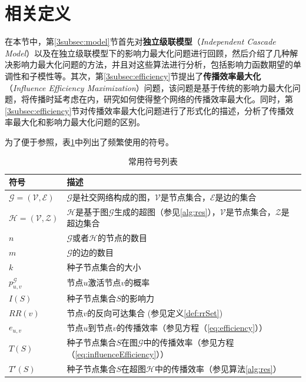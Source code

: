 \section{相关定义}
\label{3sec:definition}
在本节中，第\ref{3subsec:model}节首先对\textbf{独立级联模型}（\textit{Independent Cascade Model}）以及在独立级联模型下的影响力最大化问题进行回顾，然后介绍了几种解决影响力最大化问题的方法，并且对这些算法进行分析，包括影响力函数期望的单调性和子模性等。其次，第\ref{3subsec:efficiency}节提出了\textbf{传播效率最大化}（\textit{Influence Efficiency Maximization}）问题，该问题是基于传统的影响力最大化问题，将传播时延考虑在内，研究如何使得整个网络的传播效率最大化。同时，第\ref{3subsec:efficiency}节对传播效率最大化问题进行了形式化的描述，分析了传播效率最大化和影响力最大化问题的区别。

为了便于参照，表\ref{3tab:notation}中列出了频繁使用的符号。

\begin{table}[ht]
\centering
\caption{常用符号列表}
\begin{tabular}{|p{2cm}|p{10cm}|}
\hline
\textbf{符号} & \textbf{描述} \\
\hline
$\mathcal{G}=\left(\mathcal{V},\mathcal{E}\right)$ & $\mathcal{G}$是社交网络构成的图，$\mathcal{V}$是节点集合，$\mathcal{E}$是边的集合\\
\hline
$\mathcal{H}=\left(\mathcal{V},\mathcal{Z}\right)$ & $\mathcal{H}$是基于图$\mathcal{G}$生成的超图（参见\ref{alg:res}），$\mathcal{V}$是节点集合，$\mathcal{Z}$是超边集合\\
\hline
$n$ & $\mathcal{G}$或者$\mathcal{H}$的节点的数目 \\
\hline
$m$ & $\mathcal{G}$的边的数目 \\
\hline
$k$ & 种子节点集合的大小 \\
\hline
$p^\mathcal{G}_{u,v}$ & 节点$u$激活节点$v$的概率 \\
\hline
$I\left(S\right)$ & 种子节点集合$S$的影响力 \\
\hline
$RR\left(v\right)$ & 节点$v$的反向可达集合 (参见定义\ref{def:rrSet}) \\
\hline
$e_{u,v}$ & 节点$u$到节点$v$的传播效率（参见方程（\ref{eq:efficiency}）） \\
\hline
$T\left(S\right)$ & 种子节点集合$S$在图$\mathcal{G}$中的传播效率（参见方程（\ref{eq:influenceEfficiency}））\\
\hline
$T'\left(S\right)$ & 种子节点集合$S$在超图$\mathcal{H}$中的传播效率（参见算法\ref{alg:res}）\\
\hline
\end{tabular}
\label{3tab:notation}
\end{table}

